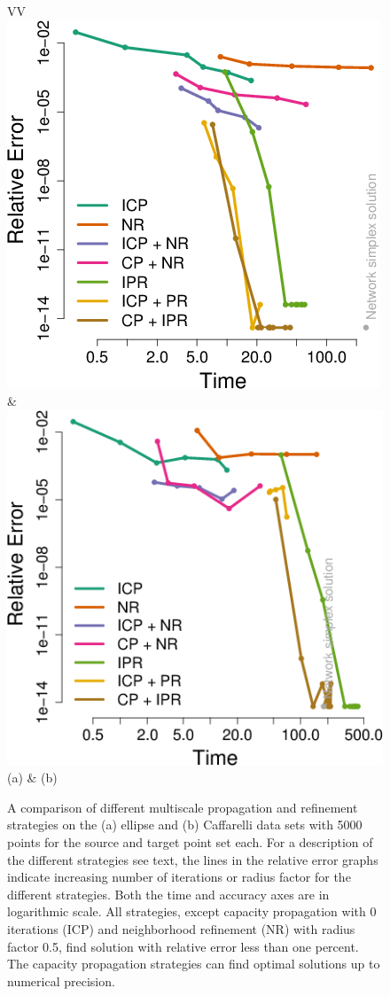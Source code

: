 \documentclass[twoside,11pt]{article}
\begin{document}
\begin{figure}[htb]
\centering
\begin{tabular}{VV}
\includegraphics[width=0.85\linewidth]{ellipses-performance-strategies} &
\includegraphics[width=0.85\linewidth]{caffarelli-performance-strategies} \\
                      (a) & (b)  
\end{tabular}
  \vspace{-0.15in}
\caption{
\label{fig:strategies}
A comparison of different multiscale propagation and refinement strategies on
the (a) ellipse and (b) Caffarelli data sets with 5000 points for the source and
target point set each. For a description of the different strategies see text,
the lines in the relative error graphs indicate increasing number of iterations
or radius factor for the different strategies.  Both the time and accuracy axes
are in logarithmic scale. All strategies, except capacity propagation with $0$
iterations (ICP) and neighborhood refinement (NR) with radius factor 0.5, find
solution with relative error less than one percent. The capacity propagation
strategies can find optimal solutions up to numerical precision.} 
\end{figure}
\end{document}
